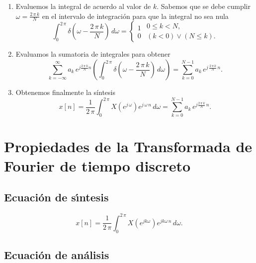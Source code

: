 \begin{enumerate}
\item Evaluemos la integral de acuerdo al valor de $k$. Sabemos que se debe cumplir $\omega = \frac{2 \, \pi \, k}{N}$ en el intervalo de integración para que
la integral no sea nula
\begin{equation}
\int_{0}^{2 \, \pi}\delta \left( \omega -\frac{2 \, \pi \, k}{N}\right) \, d\omega
=
\left\{ 
\begin{array}{c}
1 \\ 
0
\end{array}
\begin{array}{c}
0\leq k<N, \\ 
\left( k<0\right) \vee \left(N \leq k\right).
\end{array}
\right.
\end{equation}
\item Evaluamos la sumatoria de integrales para obtener
\begin{equation}
\sum_{k=-\infty }^{\infty }
a_{k} \, e^{j\frac{2 \, \pi \, k}{N}n}
\left( \int_{0}^{2 \, \pi}\delta \left( \omega -\frac{2 \, \pi \, k}{N}\right) \, d\omega \right)=
\sum_{k=0}^{N-1}a_{k} \, e^{j \, \frac{2 \, \pi \, k}{N} \, n}.
\end{equation}

\item Obtenemos finalmente la s\'{i}ntesis
\begin{equation}
x\left[ n\right] =\frac{1}{2 \, \pi }\int_{0}^{2 \, \pi }X\left( e^{j \, \omega
}\right) e^{j \, \omega \, n}\, d\omega =\sum_{k=0}^{N-1}a_{k} \, e^{j\frac{2 \, \pi \, k}{N} \, n}.
\end{equation}

\end{enumerate}

\section{Propiedades de la Transformada de Fourier de tiempo discreto}

\subsection{Ecuaci\'{o}n de s\'{\i}ntesis}

\begin{equation}
x\left[ n\right] =
\frac{1}{2 \, \pi }\int_{0}^{2 \, \pi }X\left( e^{jk\omega}\right) e^{jk\omega \, n}\, d\omega.
\end{equation}

\subsection{Ecuaci\'{o}n de an\'{a}lisis}

